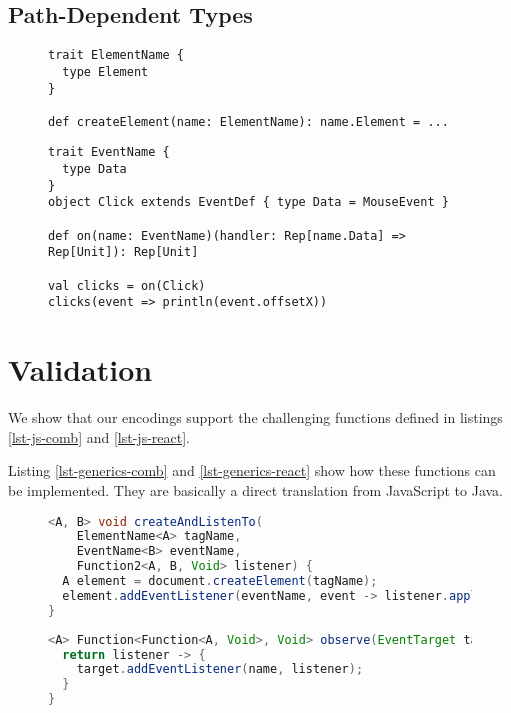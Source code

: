 \documentclass{llncs}
\begin{document}
\subsection{Path-Dependent Types}

\begin{figure}
\begin{lstlisting}[label=lst-dt-dom]
trait ElementName {
  type Element
}

def createElement(name: ElementName): name.Element = ...
\end{lstlisting}
\end{figure}


\begin{figure}
\begin{lstlisting}[label=lst-dt-events]
trait EventName {
  type Data
}
object Click extends EventDef { type Data = MouseEvent }

def on(name: EventName)(handler: Rep[name.Data] => Rep[Unit]): Rep[Unit]

val clicks = on(Click)
clicks(event => println(event.offsetX))
\end{lstlisting}
\end{figure}

\section{Validation}
\label{sec-validation}

We show that our encodings support the challenging functions defined in listings \ref{lst-js-comb} and \ref{lst-js-react}.

Listing \ref{lst-generics-comb} and \ref{lst-generics-react} show how these functions can be implemented. They are basically a direct translation from JavaScript to Java.

\begin{figure}
\begin{lstlisting}[label=lst-generics-comb,language=java]
<A, B> void createAndListenTo(
    ElementName<A> tagName,
    EventName<B> eventName,
    Function2<A, B, Void> listener) {
  A element = document.createElement(tagName);
  element.addEventListener(eventName, event -> listener.apply(event, element));
}
\end{lstlisting}
\end{figure}

\begin{figure}
\begin{lstlisting}[label=lst-generics-react,language=java]
<A> Function<Function<A, Void>, Void> observe(EventTarget target, EventName<A> name) {
  return listener -> {
    target.addEventListener(name, listener);
  }
}
\end{lstlisting}
\end{figure}
\end{document}
